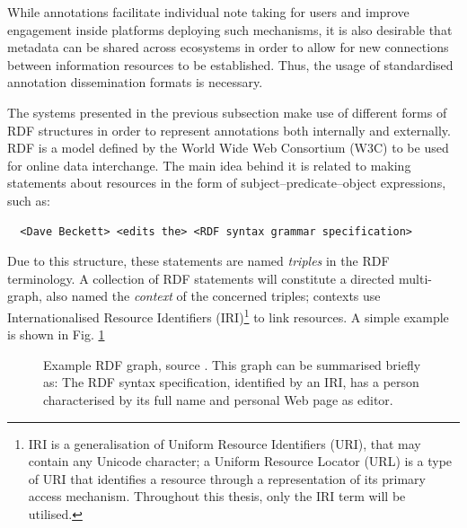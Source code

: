 
While annotations facilitate individual note taking for users and improve
engagement inside platforms deploying such mechanisms, it is also desirable
that metadata can be shared across ecosystems in order to allow for new
connections between information resources to be established. Thus, the usage of
standardised annotation dissemination formats is necessary.

The systems presented in the previous subsection make use of different forms of
RDF structures in order to represent annotations both internally and
externally.  RDF \cite{ref:rdf} is a model defined by the World Wide Web
Consortium (W3C) to be used for online data interchange. The main idea behind
it is related to making statements about resources in the form of
subject--predicate--object expressions, such as:

\begin{verbatim}
  <Dave Beckett> <edits the> <RDF syntax grammar specification>
\end{verbatim}

Due to this structure, these statements are named \textit{triples} in the RDF
terminology.  A collection of RDF statements will constitute a directed
multi-graph, also named the \textit{context} of the concerned triples; contexts
use Internationalised Resource Identifiers (IRI)\footnote{IRI is a
generalisation of Uniform Resource Identifiers (URI), that may contain any
Unicode character; a Uniform Resource Locator (URL) is a type of URI that
identifies a resource through a representation of its primary access
mechanism. Throughout this thesis, only the IRI term will be utilised.} to
link resources. A simple example is shown in Fig. \ref{fig:rdf}

\begin{figure}[!ht]
  \centering
  \caption[Example RDF graph]
          {Example RDF graph, source \cite{ref:rdfsyntax}. This graph
           can be summarised briefly as: The RDF syntax specification,
           identified by an IRI, has a person characterised by its full name and
           personal Web page as editor.}
  \label{fig:rdf}
\end{figure}

